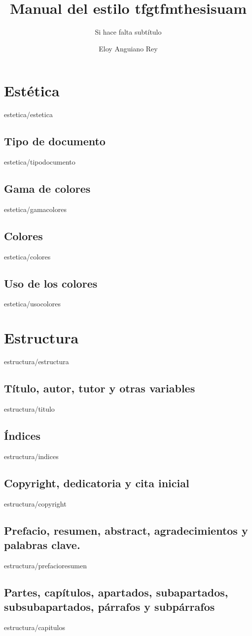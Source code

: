 \documentclass[epsbased,copyright,final,printable,covers,extendedindex,firstnumbered,tfg,gnuplot]{tfgtfmthesisuam}
\title{Manual del estilo tfgtfmthesisuam}
\subtitle{Si hace falta subtítulo}
\author{Eloy Anguiano Rey}
\begin{document}
\chapter{Estética\label{CAP:ESTETICA}}{estetica/estetica}
  \section{Tipo de documento\label{SEC:TIPODOC}}{estetica/tipodocumento}
  \section{Gama de colores\label{SEC:GAMASEL}}{estetica/gamacolores}
  \section{Colores\label{SEC:COLORES}}{estetica/colores}
  \section{Uso de los colores\label{SEC:USOCOLORES}}{estetica/usocolores}

\chapter{Estructura\label{CAP:ESTRUCTURA}}{estructura/estructura}
  \section{Título, autor, tutor y otras variables\label{SEC:VARIABLES}}{estructura/titulo}
  \section{Índices\label{SEC:INDICES}}{estructura/indices}
  \section{Copyright, dedicatoria y cita inicial\label{SEC:COPYRIGHT}}{estructura/copyright}
  \section[Prefacio, resumen ...]{Prefacio, resumen, abstract, agradecimientos y palabras clave.\label{SEC:PREFACIO}}{estructura/prefacioresumen}
  \section[Partes, capítulos ...]{Partes, capítulos, apartados, subapartados, subsubapartados, párrafos y subpárrafos\label{SEC:CAPITULOS}}{estructura/capitulos}
\end{document}
